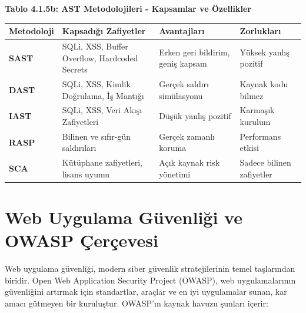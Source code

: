 \textbf{Tablo 4.1.5b: AST Metodolojileri - Kapsamlar ve Özellikler}

\begin{tabular}{|p{2cm}|p{4cm}|p{4cm}|p{3.5cm}|}
\hline
\textbf{Metodoloji} & \textbf{Kapsadığı Zafiyetler} & \textbf{Avantajları} & \textbf{Zorlukları} \\
\hline
\textbf{SAST} & SQLi, XSS, Buffer Overflow, Hardcoded Secrets & Erken geri bildirim, geniş kapsam & Yüksek yanlış pozitif \\
\hline
\textbf{DAST} & SQLi, XSS, Kimlik Doğrulama, İş Mantığı & Gerçek saldırı simülasyonu & Kaynak kodu bilmez \\
\hline
\textbf{IAST} & SQLi, XSS, Veri Akışı Zafiyetleri & Düşük yanlış pozitif & Karmaşık kurulum \\
\hline
\textbf{RASP} & Bilinen ve sıfır-gün saldırıları & Gerçek zamanlı koruma & Performans etkisi \\
\hline
\textbf{SCA} & Kütüphane zafiyetleri, lisans uyumu & Açık kaynak risk yönetimi & Sadece bilinen zafiyetler \\
\hline
\end{tabular}

\section{Web Uygulama Güvenliği ve OWASP Çerçevesi}

Web uygulama güvenliği, modern siber güvenlik stratejilerinin temel taşlarından biridir. Open Web Application Security Project (OWASP), web uygulamalarının güvenliğini artırmak için standartlar, araçlar ve en iyi uygulamalar sunan, kar amacı gütmeyen bir kuruluştur. OWASP'ın kaynak havuzu şunları içerir:

